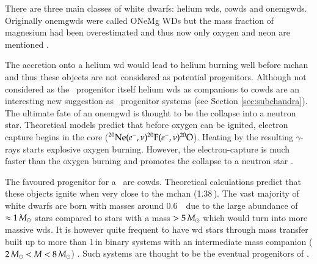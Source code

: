 There are three main classes of white dwarfs: helium \glspl{wd}, \glspl{cowd} and \glspl{onemgwd}. Originally \glspl{onemgwd} were called ONeMg WDs but the mass fraction of magnesium had been overestimated and thus now only oxygen and neon are mentioned \citep{1996ApJ...460..489R}. 

The accretion onto a helium \gls{wd} would lead to helium burning well before \gls{mchan} and thus these objects are not considered as potential progenitors. Although not considered as the \snia\ progenitor itself helium \glspl{wd} as companions to \glspl{cowd} are an interesting new suggestion as \snia\ progenitor systems (see Section \ref{sec:subchandra}). The ultimate fate of an \gls{onemgwd} is thought to be the collapse into a neutron star. Theoretical models predict that before oxygen can be ignited, electron capture begins in the core ($\Ne(e^-,\nu)\F[20](e^-,\nu)\Ox[20]$). Heating by the resulting $\gamma$-rays starts explosive oxygen burning. However, the electron-capture is much faster than the oxygen burning and promotes the collapse to a neutron star \citep{1991ApJ...367L..19N, 2005A&A...435..231G}. 

The favoured progenitor for a \snia\  are \glspl{cowd}. Theoretical calculations predict that these objects ignite when very close to the \gls{mchan} (1.38\,\msun). The vast majority of white dwarfs are born with masses around 0.6\,\msun\ \citep{2007MNRAS.375.1315K} due to the large abundance of  $\approx 1\,\msun$ stars compared to stars with a mass $> 5\,\msun$ which would turn into more massive \glspl{wd}.  It is however quite frequent to have \gls{wd} stars through mass transfer built up to more than 1\,\msun in binary systems with an intermediate mass companion ($ 2\,\msun < M < 8\,\msun$) . Such systems are thought to be the eventual progenitors of \snia.


